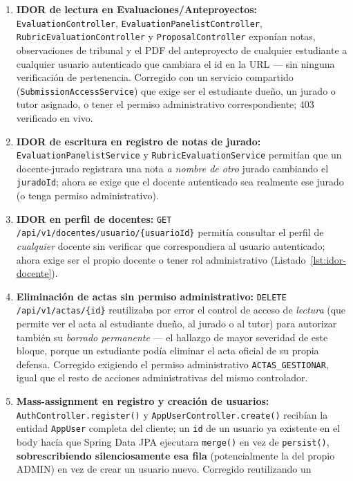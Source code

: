 \begin{enumerate}[nosep]
    \item \textbf{IDOR de lectura en Evaluaciones/Anteproyectos:} \texttt{EvaluationController},
    \texttt{EvaluationPanelistController}, \texttt{RubricEvaluationController} y
    \texttt{ProposalController} exponían notas, observaciones de tribunal y el PDF del anteproyecto
    de cualquier estudiante a cualquier usuario autenticado que cambiara el id en la URL --- sin ninguna
    verificación de pertenencia. Corregido con un servicio compartido
    (\texttt{SubmissionAccessService}) que exige ser el estudiante dueño, un jurado o tutor asignado, o
    tener el permiso administrativo correspondiente; 403 verificado en vivo.
    \item \textbf{IDOR de escritura en registro de notas de jurado:} \texttt{EvaluationPanelistService} y
    \texttt{RubricEvaluationService} permitían que un docente-jurado registrara una nota \emph{a nombre
    de otro} jurado cambiando el \texttt{juradoId}; ahora se exige que el docente autenticado sea
    realmente ese jurado (o tenga permiso administrativo).
    \item \textbf{IDOR en perfil de docentes:} \texttt{GET /api/v1/docentes/usuario/\{usuarioId\}}
    permitía consultar el perfil de \emph{cualquier} docente sin verificar que correspondiera al usuario
    autenticado; ahora exige ser el propio docente o tener rol administrativo (Listado~\ref{lst:idor-docente}).
    \item \textbf{Eliminación de actas sin permiso administrativo:} \texttt{DELETE
    /api/v1/actas/\{id\}} reutilizaba por error el control de acceso de \emph{lectura} (que permite ver
    el acta al estudiante dueño, al jurado o al tutor) para autorizar también su \emph{borrado
    permanente} --- el hallazgo de mayor severidad de este bloque, porque un estudiante podía eliminar
    el acta oficial de su propia defensa. Corregido exigiendo el permiso administrativo
    \texttt{ACTAS\_GESTIONAR}, igual que el resto de acciones administrativas del mismo controlador.
    \item \textbf{Mass-assignment en registro y creación de usuarios:} \texttt{AuthController.register()}
    y \texttt{AppUserController.create()} recibían la entidad \texttt{AppUser} completa del cliente; un
    \texttt{id} de un usuario ya existente en el body hacía que Spring Data JPA ejecutara
    \texttt{merge()} en vez de \texttt{persist()}, \textbf{sobrescribiendo silenciosamente esa fila}
    (potencialmente la del propio ADMIN) en vez de crear un usuario nuevo. Corregido reutilizando un

\end{enumerate}
